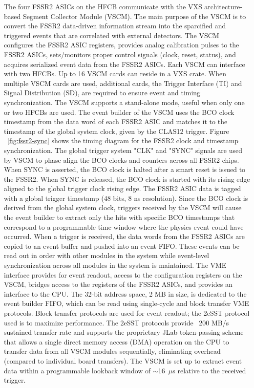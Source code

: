 The four FSSR2 ASICs on the HFCB communicate with the VXS architecture-based Segment Collector Module (VSCM). The main purpose of the VSCM is to convert the FSSR2 data-driven information stream into the sparcified and triggered events that are correlated with external detectors. The VSCM configures the FSSR2 ASIC registers, provides analog calibration pulses to the FSSR2 ASICs, sets/monitors proper control signals (clock, reset, status), and acquires serialized event data from the FSSR2 ASICs. Each VSCM can interface with two HFCBs. Up to 16 VSCM cards can reside in a VXS crate. When multiple VSCM cards are used, additional cards, the Trigger Interface (TI) and Signal Distribution (SD), are required to ensure event and timing synchronization. The VSCM supports a stand-alone mode, useful when only one or two HFCBs are used. The event builder of the VSCM uses the BCO clock timestamp from the data word of each FSSR2 ASIC and matches it to the timestamp of the global system clock, given by the CLAS12 trigger. Figure ~\ref{fig:fssr2-sync} shows the timing diagram for the FSSR2 clock and timestamp synchronization. The global trigger system "CLK" and "SYNC" signals are used by VSCM to phase align the BCO clocks  and counters across all FSSR2 chips. When SYNC is asserted, the BCO clock is halted after a smart reset is issued to the FSSR2. When SYNC is released, the BCO clock is started with its rising edge aligned to the global trigger clock rising edge. The FSSR2 ASIC data is tagged with a global trigger timestamp (48 bits, 8 ns resolution). Since the BCO clock is derived from the global system clock, triggers received by the VSCM will cause the event builder to extract only the hits with specific BCO timestamps that correspond to a programmable time window where the physics event could have occurred. When a trigger is received, the data words from the FSSR2 ASICs are copied to an event buffer and pushed into an event FIFO. These events can be read out in order with other modules in the system while event-level synchronization across all modules in the system is maintained. The VME interface provides for event readout, access to the configuration registers on the VSCM, bridges access to the registers of the FSSR2 ASICs, and provides an interface to the CPU. The 32-bit address space, 2 MB in size, is dedicated to the event builder FIFO, which can be read using single-cycle and block transfer VME protocols. Block transfer protocols are used for event readout; the 2eSST protocol used is to maximize performance. The 2eSST protocols provide ~200 MB/s sustained transfer rate and supports the proprietary JLab token-passing scheme that allows a single direct memory access (DMA) operation on the CPU to transfer data from all VSCM modules sequentially, eliminating overhead (compared to individual board transfers). The VSCM is set up to extract event data within a programmable lookback window of $\sim$16~$\mu$s relative to the received trigger. 

